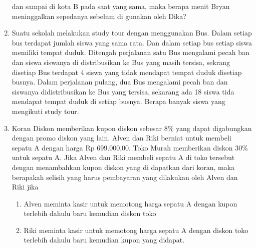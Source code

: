 \documentclass[12pt,a4paper,draft,final,oneside,twoside,openright,openany]{article}
\begin{document}
\begin{enumerate}
		dan sampai di kota B pada saat yang sama, maka berapa menit Bryan meninggalkan
		sepedanya sebelum di gunakan oleh Dika?
		\item Suatu sekolah melakukan study tour dengan menggunakan Bus. Dalam setiap bus
		terdapat jumlah siswa yang sama rata. Dan dalam setiap bus setiap siswa memiliki tempat
		duduk. Ditengah perjalanan satu Bus mengalami pecah ban dan siswa siswanya di
		distribusikan ke Bus yang masih tersisa, sekrang disetiap Bus terdapat 4 siswa yang tidak
		mendapat tempat duduk disetiap busnya. Dalam perjalanan pulang, dua Bus mengalami
		pecah ban dan siswanya didistribusikan ke Bus yang tersisa, sekarang ada 18 siswa tida
		mendapat tempat duduk di setiap busnya. Berapa banyak siswa yang mengikuti study
		tour.
		\item Koran Diskon memberikan kupon diskon sebesar $8\%$ yang dapat digabungkan dengan promo
		diskon yang lain. Alven dan Riki berniat untuk membeli sepatu A dengan harga Rp
		699.000,00. Toko Murah memberikan diskon $30\%$ untuk sepatu A. Jika Alven dan Riki
		membeli sepatu A di toko tersebut dengan menambahkan kupon diskon yang di dapatkan dari
		koran, maka berapakah selisih yang harus pembayaran yang dilakukan oleh Alven dan Riki
		jika
		\begin{enumerate}
			\item  Alven meminta kasir untuk memotong harga sepatu A dengan kupon terlebih dahulu baru
			kemudian diskon toko
			\item Riki meminta kasir untuk memotong harga sepatu A dengan diskon toko terlebih dahulu
			baru kemudian kupon yang didapat.
		\end{enumerate}
	\end{enumerate}
\end{document}

